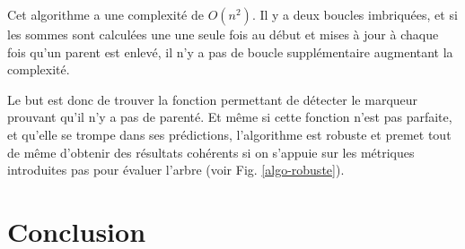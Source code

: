 \documentclass[utf8]{stageM2R} %
\begin{document}
Cet algorithme a une complexité de $O(n^{2})$. Il y a deux boucles imbriquées, et si les sommes sont calculées une une seule fois au début et mises à jour à chaque fois qu'un parent est enlevé, il n'y a pas de boucle supplémentaire augmentant la complexité.

Le but est donc de trouver la fonction permettant de détecter le marqueur prouvant qu'il n'y a pas de parenté. Et même si cette fonction n'est pas parfaite, et qu'elle se trompe dans ses prédictions, l'algorithme est robuste et premet tout de même d'obtenir des résultats cohérents si on s'appuie sur les métriques introduites pas \cite{dias2010first} pour évaluer l'arbre (voir Fig. \ref{algo-robuste}).

\chapter{Conclusion}

\printbibliography
\end{document}
